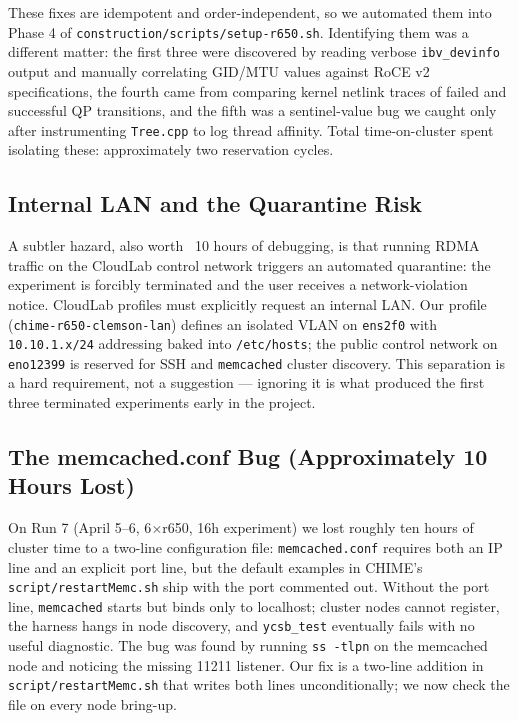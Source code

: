 \documentclass[11pt,a4paper]{article}
\begin{document}
These fixes are idempotent and order-independent, so we automated them into Phase 4 of \texttt{construction/scripts/setup-r650.sh}. Identifying them was a different matter: the first three were discovered by reading verbose \texttt{ibv\_devinfo} output and manually correlating GID/MTU values against RoCE v2 specifications, the fourth came from comparing kernel netlink traces of failed and successful QP transitions, and the fifth was a sentinel-value bug we caught only after instrumenting \texttt{Tree.cpp} to log thread affinity. Total time-on-cluster spent isolating these: approximately two reservation cycles.

\subsection{Internal LAN and the Quarantine Risk}

A subtler hazard, also worth ~10 hours of debugging, is that running RDMA traffic on the CloudLab control network triggers an automated quarantine: the experiment is forcibly terminated and the user receives a network-violation notice. CloudLab profiles must explicitly request an internal LAN. Our profile (\texttt{chime-r650-clemson-lan}) defines an isolated VLAN on \texttt{ens2f0} with \texttt{10.10.1.x/24} addressing baked into \texttt{/etc/hosts}; the public control network on \texttt{eno12399} is reserved for SSH and \texttt{memcached} cluster discovery. This separation is a hard requirement, not a suggestion --- ignoring it is what produced the first three terminated experiments early in the project.

\subsection{The memcached.conf Bug (Approximately 10 Hours Lost)}

On Run 7 (April 5--6, 6$\times$r650, 16h experiment) we lost roughly ten hours of cluster time to a two-line configuration file: \texttt{memcached.conf} requires both an IP line and an explicit port line, but the default examples in CHIME's \texttt{script/restartMemc.sh} ship with the port commented out. Without the port line, \texttt{memcached} starts but binds only to localhost; cluster nodes cannot register, the harness hangs in node discovery, and \texttt{ycsb\_test} eventually fails with no useful diagnostic. The bug was found by running \texttt{ss -tlpn} on the memcached node and noticing the missing 11211 listener. Our fix is a two-line addition in \texttt{script/restartMemc.sh} that writes both lines unconditionally; we now check the file on every node bring-up.
\end{document}
